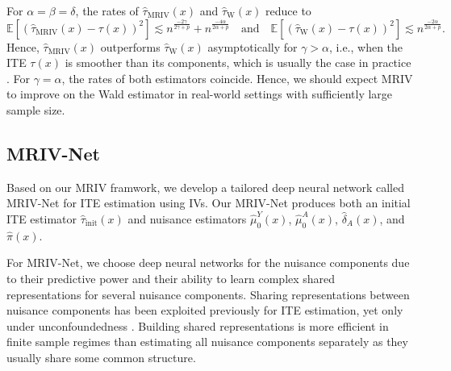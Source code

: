 \documentclass[nonatbib]{article}
\newcommand{\E}{\mathbb{E}}
\newcommand{\frameworkname}{MRIV\xspace}
\newcommand{\modelname}{\mbox{MRIV-Net}\xspace}
\theoremstyle{definition}
\theoremstyle{plain}
\begin{document}
For $\alpha = \beta = \delta$, the rates of $\hat{\tau}_{\mathrm{MRIV}}(x)$ and $\hat{\tau}_{\mathrm{W}}(x)$ reduce to
\begin{equation}
    \E\left[\left(\hat{\tau}_{\mathrm{MRIV}}(x) - \tau(x)\right)^2\right] \lesssim n^{\frac{-2\gamma}{2\gamma+p}} +
    n^{\frac{-4\alpha}{2\alpha+p}} \quad \text{and} \quad
        \E\left[\left(\hat{\tau}_{\mathrm{W}}(x) - \tau(x)\right)^2\right] \lesssim 
    n^{\frac{-2\alpha}{2\alpha+p}}.
\end{equation}
Hence, $\hat{\tau}_{\mathrm{MRIV}}(x)$ outperforms $\hat{\tau}_{\mathrm{W}}(x)$ asymptotically for $\gamma > \alpha$, i.e., when the ITE $\tau(x)$ is smoother than its components, which is usually the case in practice \cite{Kunzel.2019}. For $\gamma = \alpha$, the rates of both estimators coincide. Hence, we should expect MRIV to improve on the Wald estimator in real-world settings with sufficiently large sample size.

\subsection{\modelname}\label{sec:neural_nets}

Based on our \frameworkname framwork, we develop a tailored deep neural network called \modelname for ITE estimation using IVs. Our \modelname produces both an initial ITE estimator $\hat{\tau}_{\mathrm{init}}(x)$ and nuisance estimators $\hat{\mu}_0^Y(x)$, $\hat{\mu}_0^A(x)$, $\hat{\delta}_A(x)$, and $\hat{\pi}(x)$. 


For \modelname, we choose deep neural networks for the nuisance components due to their predictive power and their ability to learn complex shared representations for several nuisance components. Sharing representations between nuisance components has been exploited previously for ITE estimation, yet only under unconfoundedness \cite{Shalit.2017, Curth.2021}. Building shared representations is more efficient in finite sample regimes than estimating all nuisance components separately as they usually share some common structure. 
\end{document}
